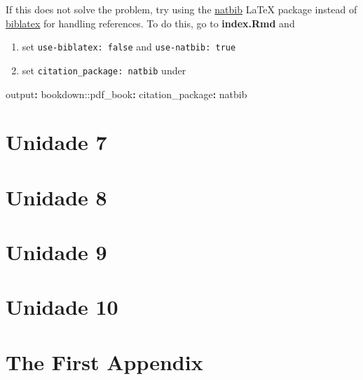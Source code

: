 \documentclass[a4paper, twoside]{templates/ociamthesis}
\providecommand{\tightlist}{%
  \setlength{\itemsep}{0pt}\setlength{\parskip}{0pt}}
\newenvironment{Shaded}{\begin{snugshade}}{\end{snugshade}}
\newcommand{\AttributeTok}[1]{\textcolor[rgb]{0.77,0.63,0.00}{#1}}
\newcommand{\FunctionTok}[1]{\textcolor[rgb]{0.00,0.00,0.00}{#1}}
\newcommand{\KeywordTok}[1]{\textcolor[rgb]{0.13,0.29,0.53}{\textbf{#1}}}
\renewenvironment{Shaded}
{
  \vspace{10pt}%
  \begin{snugshade}%
}{%
  \end{snugshade}%
  \vspace{8pt}%
}
\begin{document}
If this does not solve the problem, try using the \href{https://www.overleaf.com/learn/latex/Bibliography_management_with_natbib}{natbib} LaTeX package instead of \href{https://www.overleaf.com/learn/latex/Articles/Getting_started_with_BibLaTeX}{biblatex} for handling references.
To do this, go to \textbf{index.Rmd} and

\begin{enumerate}
\def\labelenumi{\arabic{enumi}.}
\tightlist
\item
  set \texttt{use-biblatex:\ false} and \texttt{use-natbib:\ true}
\item
  set \texttt{citation\_package:\ natbib} under
\end{enumerate}

\begin{Shaded}
\begin{Highlighting}[]
\FunctionTok{output}\KeywordTok{:}
\AttributeTok{  bookdown:}\FunctionTok{:pdf\_book}\KeywordTok{:}
\AttributeTok{    }\FunctionTok{citation\_package}\KeywordTok{:}\AttributeTok{ natbib}
\end{Highlighting}
\end{Shaded}

\hypertarget{unidade-7}{%
\chapter{Unidade 7}\label{unidade-7}}

\hypertarget{unidade-8}{%
\chapter{Unidade 8}\label{unidade-8}}

\hypertarget{unidade-9}{%
\chapter{Unidade 9}\label{unidade-9}}

\hypertarget{unidade-10}{%
\chapter{Unidade 10}\label{unidade-10}}

\startappendices

\hypertarget{the-first-appendix}{%
\chapter{The First Appendix}\label{the-first-appendix}}
\end{document}
